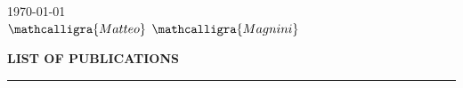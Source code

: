 \documentclass{resume} %
\begin{document}
    \vspace{2em} %
    \begin{flushright}
        \today
        \\
        \vspace{1em}
        \Large$\mathcalligra{Matteo}$  $\mathcalligra{Magnini}$
        
    \end{flushright}

    \pagebreak
    \MakeUppercase{\bf List of Publications} %
    \sectionlineskip
    \hrule %
    \vspace{-1cm}
    \nocite{*}
    
    \renewcommand\refname{}
    
    
\end{document}
